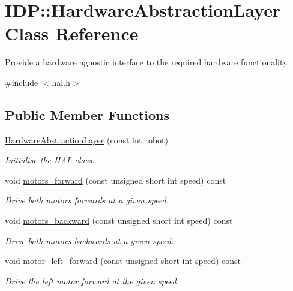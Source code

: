 \hypertarget{classIDP_1_1HardwareAbstractionLayer}{
\section{IDP::HardwareAbstractionLayer Class Reference}
\label{classIDP_1_1HardwareAbstractionLayer}
}


Provide a hardware agnostic interface to the required hardware functionality.  




{\ttfamily \#include $<$hal.h$>$}

\subsection*{Public Member Functions}
\begin{DoxyCompactItemize}
\item 
\hyperlink{classIDP_1_1HardwareAbstractionLayer_a424d40bbaed459f571b46dbb45bb8576}{HardwareAbstractionLayer} (const int robot)
\begin{DoxyCompactList}\small\item\em Initialise the HAL class. \item\end{DoxyCompactList}\item 
void \hyperlink{classIDP_1_1HardwareAbstractionLayer_a0c5a7c42e881c0b4bf8b3f5497c1e4ca}{motors\_\-forward} (const unsigned short int speed) const 
\begin{DoxyCompactList}\small\item\em Drive both motors forwards at a given speed. \item\end{DoxyCompactList}\item 
void \hyperlink{classIDP_1_1HardwareAbstractionLayer_a43a8ac2e89e101cd8976ce10401e6142}{motors\_\-backward} (const unsigned short int speed) const 
\begin{DoxyCompactList}\small\item\em Drive both motors backwards at a given speed. \item\end{DoxyCompactList}\item 
void \hyperlink{classIDP_1_1HardwareAbstractionLayer_a164279a4dd6b8cbbc32f6b2bc3f27577}{motor\_\-left\_\-forward} (const unsigned short int speed) const 
\begin{DoxyCompactList}\small\item\em Drive the left motor forward at the given speed. \item\end{DoxyCompactList}\item 

\end{DoxyCompactItemize}
